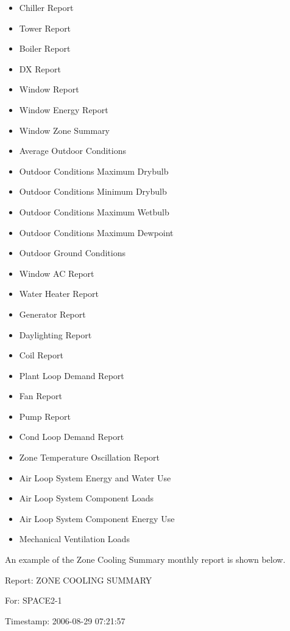 \begin{itemize}
\item
  Chiller Report
\item
  Tower Report
\item
  Boiler Report
\item
  DX Report
\item
  Window Report
\item
  Window Energy Report
\item
  Window Zone Summary
\item
  Average Outdoor Conditions
\item
  Outdoor Conditions Maximum Drybulb
\item
  Outdoor Conditions Minimum Drybulb
\item
  Outdoor Conditions Maximum Wetbulb
\item
  Outdoor Conditions Maximum Dewpoint
\item
  Outdoor Ground Conditions
\item
  Window AC Report
\item
  Water Heater Report
\item
  Generator Report
\item
  Daylighting Report
\item
  Coil Report
\item
  Plant Loop Demand Report
\item
  Fan Report
\item
  Pump Report
\item
  Cond Loop Demand Report
\item
  Zone Temperature Oscillation Report
\item
  Air Loop System Energy and Water Use
\item
  Air Loop System Component Loads
\item
  Air Loop System Component Energy Use
\item
  Mechanical Ventilation Loads
\end{itemize}

An example of the Zone Cooling Summary monthly report is shown below.

Report: ZONE COOLING SUMMARY

For: SPACE2-1

Timestamp: 2006-08-29 07:21:57

